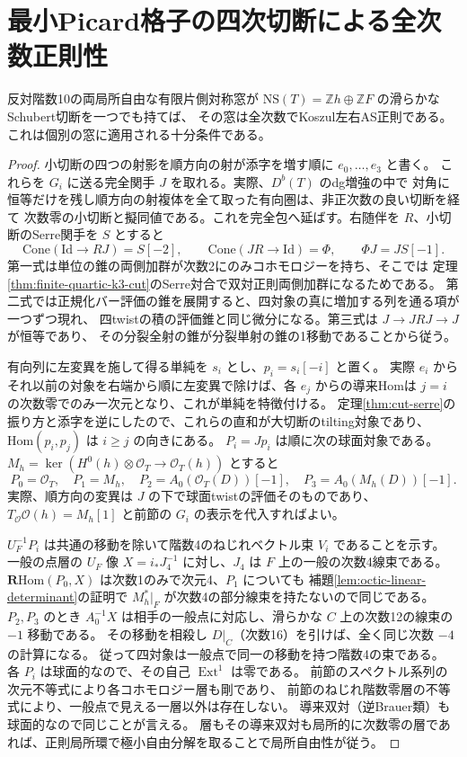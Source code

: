 \section{最小Picard格子の四次切断による全次数正則性}
\label{sec:finite-minimal-picard-regularity}
\begin{theorem}\label{thm:finite-minimal-picard-regularity}
反対階数10の両局所自由な有限片側対称窓が
$\mathrm{NS}(T)=\mathbb Zh\oplus\mathbb ZF$ の滑らかなSchubert切断を一つでも持てば、
その窓は全次数でKoszul左右AS正則である。これは個別の窓に適用される十分条件である。
\end{theorem}
\begin{proof}
小切断の四つの射影を順方向の射が添字を増す順に $e_0,\ldots,e_3$ と書く。
これらを $G_i$ に送る完全関手 $J$ を取れる。実際、$D^b(T)$ のdg増強の中で
対角に恒等だけを残し順方向の射複体を全て取った有向圏は、非正次数の良い切断を経て
次数零の小切断と擬同値である。これを完全包へ延ばす。右随伴を $R$、小切断のSerre関手を $S$ とすると
\[
 \mathrm{Cone}(\mathrm{Id}\to RJ)=S[-2],\qquad
 \mathrm{Cone}(JR\to\mathrm{Id})=\Phi,\qquad
 \Phi J=JS[-1].
\]
第一式は単位の錐の両側加群が次数2にのみコホモロジーを持ち、そこでは
定理\ref{thm:finite-quartic-k3-cut}のSerre対合で双対正則両側加群になるためである。
第二式では正規化バー評価の錐を展開すると、四対象の真に増加する列を通る項が一つずつ現れ、
四twistの積の評価錐と同じ微分になる。第三式は $J\to JRJ\to J$ が恒等であり、
その分裂全射の錐が分裂単射の錐の1移動であることから従う。

有向列に左変異を施して得る単純を $s_i$ とし、$p_i=s_i[-i]$ と置く。
実際 $e_i$ からそれ以前の対象を右端から順に左変異で除けば、各 $e_j$ からの導来Homは
$j=i$ の次数零でのみ一次元となり、これが単純を特徴付ける。
定理\ref{thm:cut-serre}の振り方と添字を逆にしたので、これらの直和が大切断のtilting対象であり、
$\mathrm{Hom}(p_i,p_j)$ は $i\ge j$ の向きにある。
$P_i=Jp_i$ は順に次の球面対象である。$M_h=\ker(H^0(h)\otimes\mathcal O_T\to\mathcal O_T(h))$ とすると
\[
 P_0=\mathcal O_T,\quad P_1=M_h,\quad
 P_2=A_0(\mathcal O_T(D))[-1],\quad P_3=A_0(M_h(D))[-1].
\]
実際、順方向の変異は $J$ の下で球面twistの評価そのものであり、
$T_{\mathcal O}\mathcal O(h)=M_h[1]$ と前節の $G_i$ の表示を代入すればよい。

$U_F^{-1}P_i$ は共通の移動を除いて階数4のねじれベクトル束 $V_i$ であることを示す。
一般の点層の $U_F$ 像 $X=i_*J_4^{-1}$ に対し、$J_4$ は $F$ 上の一般の次数4線束である。
$\mathbf R\mathrm{Hom}(P_0,X)$ は次数1のみで次元4、$P_1$ についても
補題\ref{lem:octic-linear-determinant}の証明で $M_h^*|_F$ が次数4の部分線束を持たないので同じである。
$P_2,P_3$ のとき $A_0^{-1}X$ は相手の一般点に対応し、滑らかな $C$ 上の次数12の線束の $-1$ 移動である。
その移動を相殺し $D|_C$（次数16）を引けば、全く同じ次数 $-4$ の計算になる。
従って四対象は一般点で同一の移動を持つ階数4の束である。
各 $P_i$ は球面的なので、その自己 $\operatorname{Ext}^1$ は零である。
前節のスペクトル系列の次元不等式により各コホモロジー層も剛であり、
前節のねじれ階数零層の不等式により、一般点で見える一層以外は存在しない。
導来双対（逆Brauer類）も球面的なので同じことが言える。
層もその導来双対も局所的に次数零の層であれば、正則局所環で極小自由分解を取ることで局所自由性が従う。


\end{proof}
